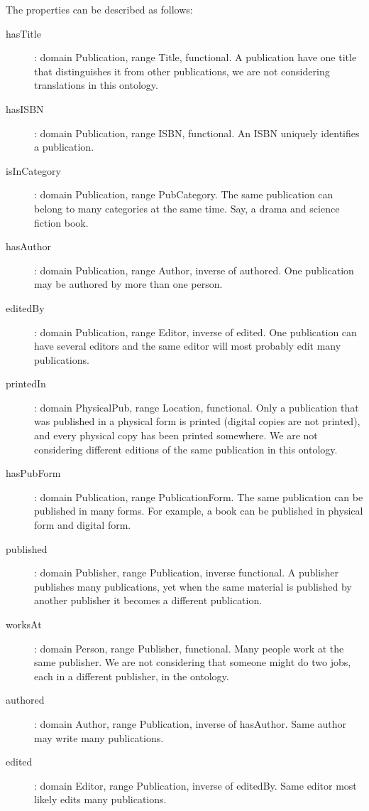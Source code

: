 \documentclass[a4paper,12pt]{article}
\begin{document}
The properties can be described as follows:
\begin{description}
\item[hasTitle]: domain Publication, range Title, functional.  A publication
have one title that distinguishes it from other publications, we are not
considering translations in this ontology.

\item[hasISBN]: domain Publication, range ISBN, functional.  An ISBN uniquely
identifies a publication.

\item[isInCategory]: domain Publication, range PubCategory.  The same
publication can belong to many categories at the same time.  Say, a drama and
science fiction book.

\item[hasAuthor]: domain Publication, range Author, inverse of authored.  One
publication may be authored by more than one person.

\item[editedBy]: domain Publication, range Editor, inverse of edited.  One
publication can have several editors and the same editor will most probably
edit many publications.

\item[printedIn]: domain PhysicalPub, range Location, functional.  Only a
publication that was published in a physical form is printed (digital copies
are not printed), and every physical copy has been printed somewhere.  We are
not considering different editions of the same publication in this ontology.

\item[hasPubForm]: domain Publication, range PublicationForm.  The same
publication can be published in many forms.  For example, a book can be
published in physical form and digital form.

\item[published]: domain Publisher, range Publication, inverse functional.  A
publisher publishes many publications, yet when the same material is published
by another publisher it becomes a different publication.

\item[worksAt]: domain Person, range Publisher, functional.  Many people work
at the same publisher.  We are not considering that someone might do two jobs,
each in a different publisher, in the ontology.

\item[authored]: domain Author, range Publication, inverse of hasAuthor.  Same
author may write many publications.

\item[edited]: domain Editor, range Publication, inverse of editedBy.  Same
editor most likely edits many publications.
\end{description}
\end{document}
